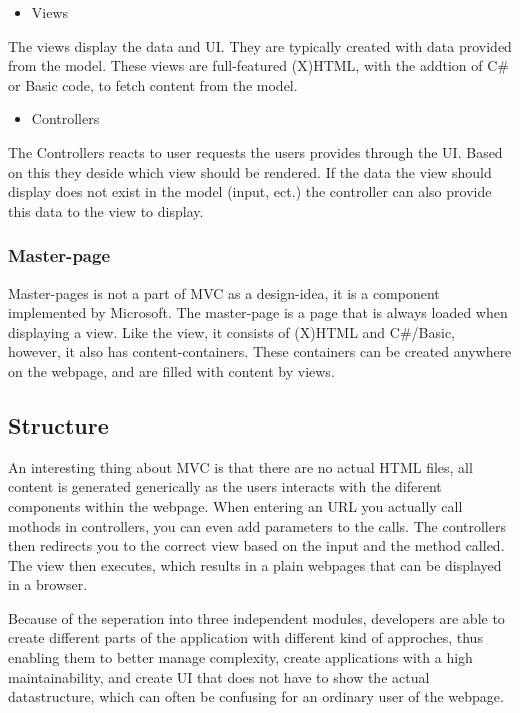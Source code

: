 \begin{itemize}
\item Views
\end{itemize}
The views display the data and UI. They are typically created with data provided from the model. These views are full-featured (X)HTML, with the addtion of C\# or Basic code, to fetch content from the model.

\begin{itemize}
\item Controllers
\end{itemize}
The Controllers reacts to user requests the users provides through the UI. Based on this they deside which view should be rendered. If the data the view should display does not exist in the model (input, ect.) the controller can also provide this data to the view to display.

\subsubsection{Master-page}
Master-pages is not a part of MVC as a design-idea, it is a component implemented by Microsoft. The master-page is a page that is always loaded when displaying a view. Like the view, it consists of (X)HTML and C\#/Basic, however, it also has content-containers. These containers can be created anywhere on the webpage, and are filled with content by views.

\subsection{Structure}
An interesting thing about MVC is that there are no actual HTML files, all content is generated generically as the users interacts with the diferent components within the webpage. When entering an URL you actually call mothods in controllers, you can even add parameters to the calls. The controllers then redirects you to the correct view based on the input and the method called. The view then executes, which results in a plain webpages that can be displayed in a browser.

Because of the seperation into three independent modules, developers are able to create different parts of the application with different kind of approches, thus enabling them to better manage complexity, create applications with a high maintainability, and create UI that does not have to show the actual datastructure, which can often be confusing for an ordinary user of the webpage.

